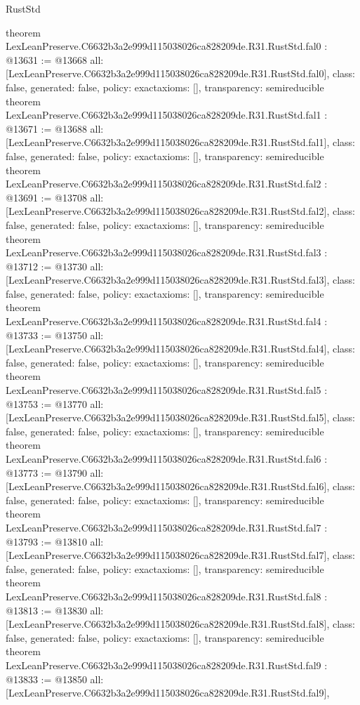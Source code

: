 \begin{lexlean}{RustStd}
\begin{coremodule}
{}
theorem LexLeanPreserve.C6632b3a2e999d115038026ca828209de.R31.RustStd.fal0 : @13631 := @13668 {
  all: [LexLeanPreserve.C6632b3a2e999d115038026ca828209de.R31.RustStd.fal0],
  class: false,
  generated: false,
  policy: exact{axioms: []},
  transparency: semireducible
}
theorem LexLeanPreserve.C6632b3a2e999d115038026ca828209de.R31.RustStd.fal1 : @13671 := @13688 {
  all: [LexLeanPreserve.C6632b3a2e999d115038026ca828209de.R31.RustStd.fal1],
  class: false,
  generated: false,
  policy: exact{axioms: []},
  transparency: semireducible
}
theorem LexLeanPreserve.C6632b3a2e999d115038026ca828209de.R31.RustStd.fal2 : @13691 := @13708 {
  all: [LexLeanPreserve.C6632b3a2e999d115038026ca828209de.R31.RustStd.fal2],
  class: false,
  generated: false,
  policy: exact{axioms: []},
  transparency: semireducible
}
theorem LexLeanPreserve.C6632b3a2e999d115038026ca828209de.R31.RustStd.fal3 : @13712 := @13730 {
  all: [LexLeanPreserve.C6632b3a2e999d115038026ca828209de.R31.RustStd.fal3],
  class: false,
  generated: false,
  policy: exact{axioms: []},
  transparency: semireducible
}
theorem LexLeanPreserve.C6632b3a2e999d115038026ca828209de.R31.RustStd.fal4 : @13733 := @13750 {
  all: [LexLeanPreserve.C6632b3a2e999d115038026ca828209de.R31.RustStd.fal4],
  class: false,
  generated: false,
  policy: exact{axioms: []},
  transparency: semireducible
}
theorem LexLeanPreserve.C6632b3a2e999d115038026ca828209de.R31.RustStd.fal5 : @13753 := @13770 {
  all: [LexLeanPreserve.C6632b3a2e999d115038026ca828209de.R31.RustStd.fal5],
  class: false,
  generated: false,
  policy: exact{axioms: []},
  transparency: semireducible
}
theorem LexLeanPreserve.C6632b3a2e999d115038026ca828209de.R31.RustStd.fal6 : @13773 := @13790 {
  all: [LexLeanPreserve.C6632b3a2e999d115038026ca828209de.R31.RustStd.fal6],
  class: false,
  generated: false,
  policy: exact{axioms: []},
  transparency: semireducible
}
theorem LexLeanPreserve.C6632b3a2e999d115038026ca828209de.R31.RustStd.fal7 : @13793 := @13810 {
  all: [LexLeanPreserve.C6632b3a2e999d115038026ca828209de.R31.RustStd.fal7],
  class: false,
  generated: false,
  policy: exact{axioms: []},
  transparency: semireducible
}
theorem LexLeanPreserve.C6632b3a2e999d115038026ca828209de.R31.RustStd.fal8 : @13813 := @13830 {
  all: [LexLeanPreserve.C6632b3a2e999d115038026ca828209de.R31.RustStd.fal8],
  class: false,
  generated: false,
  policy: exact{axioms: []},
  transparency: semireducible
}
theorem LexLeanPreserve.C6632b3a2e999d115038026ca828209de.R31.RustStd.fal9 : @13833 := @13850 {
  all: [LexLeanPreserve.C6632b3a2e999d115038026ca828209de.R31.RustStd.fal9],
}
\end{coremodule}
\end{lexlean}
